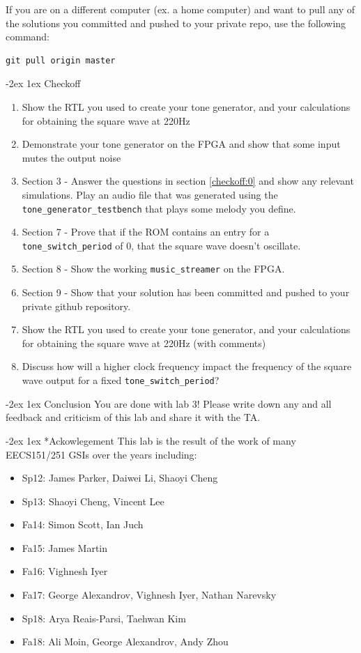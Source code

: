 \documentclass[11pt]{article}
\makeatletter
\renewcommand{\section}
{\@startsection {section}{1}{0pt}
 {-2ex}
 {1ex}
 {\bfseries\Large}}
\makeatother
\begin{document}
If you are on a different computer (ex. a home computer) and want to pull any of the solutions you committed and pushed to your private repo, use the following command:
\begin{verbatim}
git pull origin master
\end{verbatim}
\section{Checkoff}
\begin{enumerate}
  \item Show the RTL you used to create your tone generator, and your calculations for obtaining the square wave at 220Hz
  \item Demonstrate your tone generator on the FPGA and show that some input mutes the output noise
  \item Section 3 - Answer the questions in section \ref{checkoff:0} and show any relevant simulations.  Play an audio file that was generated using the \verb|tone_generator_testbench| that plays some melody you define.
  \item Section 7 - Prove that if the ROM contains an entry for a \verb|tone_switch_period| of 0, that the square wave doesn't oscillate.
  \item Section 8 - Show the working \verb|music_streamer| on the FPGA.
  \item Section 9 - Show that your solution has been committed and pushed to your private github repository.
  \item Show the RTL you used to create your tone generator, and your calculations for obtaining the square wave at 220Hz (with comments)
  \item Discuss how will a higher clock frequency impact the frequency of the square wave output for a fixed \verb|tone_switch_period|?
\end{enumerate}

\section{Conclusion}
You are done with lab 3! Please write down any and all feedback and criticism of this lab and share it with the TA.

\section*{Ackowlegement}
This lab is the result of the work of many EECS151/251 GSIs over the years including:
\begin{itemize}
\item Sp12: James Parker, Daiwei Li, Shaoyi Cheng
\item Sp13: Shaoyi Cheng, Vincent Lee
\item Fa14: Simon Scott, Ian Juch
\item Fa15: James Martin
\item Fa16: Vighnesh Iyer
\item Fa17: George Alexandrov, Vighnesh Iyer, Nathan Narevsky
\item Sp18: Arya Reais-Parsi, Taehwan Kim
\item Fa18: Ali Moin, George Alexandrov, Andy Zhou
\end{itemize}
\end{document}
